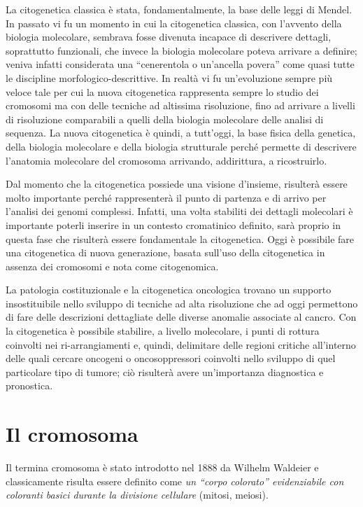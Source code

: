 \documentclass[11pt]{book}
\begin{document}
La citogenetica classica è stata, fondamentalmente, la base delle leggi di Mendel. In passato vi fu un momento in cui la citogenetica classica, con l’avvento della biologia molecolare, sembrava fosse divenuta incapace di descrivere dettagli, soprattutto funzionali, che invece la biologia molecolare poteva arrivare a definire; veniva infatti considerata una ``cenerentola o un’ancella povera'' come quasi tutte le discipline morfologico-descrittive.
In realtà vi fu un’evoluzione sempre più veloce tale per cui la nuova citogenetica rappresenta sempre lo studio dei cromosomi ma con delle tecniche ad altissima risoluzione, fino ad arrivare a livelli di risoluzione comparabili a quelli della biologia molecolare delle analisi di sequenza.
La nuova citogenetica è quindi, a tutt’oggi, la base fisica della genetica, della biologia molecolare e della biologia strutturale perché permette di descrivere l’anatomia molecolare del cromosoma arrivando, addirittura, a ricostruirlo. 

Dal momento che la citogenetica possiede una visione d’insieme, risulterà essere molto importante perché rappresenterà il punto di partenza e di arrivo per l’analisi dei genomi complessi. Infatti, una volta stabiliti dei dettagli molecolari è importante poterli inserire in un contesto cromatinico definito, sarà proprio in questa fase che risulterà essere fondamentale la citogenetica.
Oggi è possibile fare una citogenetica di nuova generazione, basata sull’uso della citogenetica in assenza dei cromosomi e nota come citogenomica.

La patologia costituzionale e la citogenetica oncologica trovano un supporto insostituibile nello sviluppo di tecniche ad alta risoluzione che ad oggi permettono di fare delle descrizioni dettagliate delle diverse anomalie associate al cancro. Con la citogenetica è possibile stabilire, a livello molecolare, i punti di rottura coinvolti nei ri-arrangiamenti e, quindi, delimitare delle regioni critiche all’interno delle quali cercare oncogeni o oncosoppressori coinvolti nello sviluppo di quel particolare tipo di tumore; ciò risulterà avere un’importanza diagnostica e pronostica.

\section{Il cromosoma}
Il termina cromosoma è stato introdotto nel 1888 da Wilhelm Waldeier e classicamente risulta essere definito come \emph{un ``corpo colorato'' evidenziabile con coloranti basici durante la divisione cellulare} (mitosi, meiosi).
\end{document}
